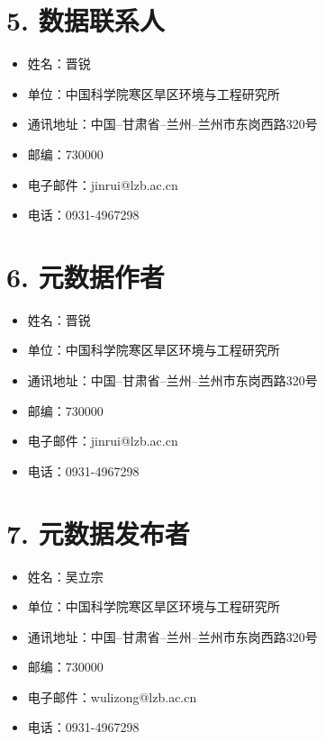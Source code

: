 \documentclass[letterpaper,10pt,english]{sphinxmanual}
\begin{document}
\section{5. 数据联系人}
\label{fecd46b0-3390-4580-a415-2d49ba77f9bd:id5}\begin{itemize}
\item {} 
姓名：晋锐

\item {} 
单位：中国科学院寒区旱区环境与工程研究所

\item {} 
通讯地址：中国--甘肃省--兰州--兰州市东岗西路320号

\item {} 
邮编：730000

\item {} 
电子邮件：jinrui@lzb.ac.cn

\item {} 
电话：0931-4967298

\end{itemize}


\section{6. 元数据作者}
\label{fecd46b0-3390-4580-a415-2d49ba77f9bd:id6}\begin{itemize}
\item {} 
姓名：晋锐

\item {} 
单位：中国科学院寒区旱区环境与工程研究所

\item {} 
通讯地址：中国--甘肃省--兰州--兰州市东岗西路320号

\item {} 
邮编：730000

\item {} 
电子邮件：jinrui@lzb.ac.cn

\item {} 
电话：0931-4967298

\end{itemize}


\section{7.      元数据发布者}
\label{fecd46b0-3390-4580-a415-2d49ba77f9bd:id7}\begin{itemize}
\item {} 
姓名：吴立宗

\item {} 
单位：中国科学院寒区旱区环境与工程研究所

\item {} 
通讯地址：中国--甘肃省--兰州--兰州市东岗西路320号

\item {} 
邮编：730000

\item {} 
电子邮件：wulizong@lzb.ac.cn

\item {} 
电话：0931-4967298

\end{itemize}
\end{document}
